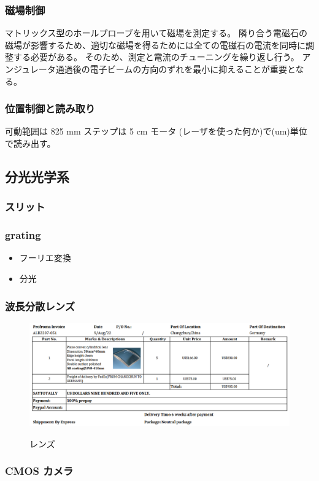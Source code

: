 \documentclass[a4paper,11pt,uplatex]{jsbook}
\begin{document}
\subsubsection{磁場制御}
マトリックス型のホールプローブを用いて磁場を測定する。
隣り合う電磁石の磁場が影響するため、適切な磁場を得るためには全ての電磁石の電流を同時に調整する必要がある。
そのため、測定と電流のチューニングを繰り返し行う。
アンジュレータ通過後の電子ビームの方向のずれを最小に抑えることが重要となる。

\subsubsection{位置制御と読み取り}
可動範囲は 825 mm
ステップは 5 cm
モータ
(レーザを使った何か)で(um)単位で読み出す。

\subsection{分光光学系}
\subsubsection{スリット}
\subsubsection{grating}
\begin{itemize}
  \item フーリエ変換
  \item 分光
\end{itemize}

\subsubsection{波長分散レンズ}
\begin{figure}[tb]
  \centering
  \includegraphics[width=0.8\linewidth]{image/3-lens.png}\\
  \caption{レンズ}
  \label{lens}
\end{figure}
\subsubsection{CMOS カメラ}
\end{document}
